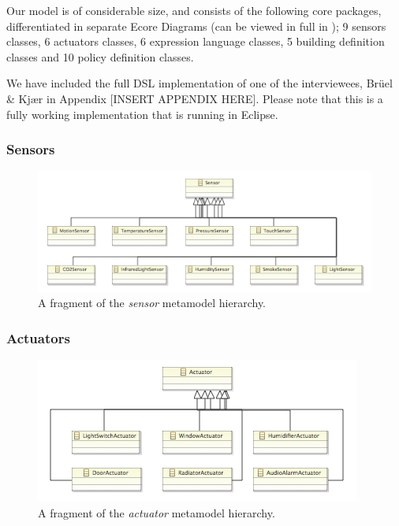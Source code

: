 \documentclass{llncs}
\begin{document}
Our model is of considerable size, and consists of the following core packages, differentiated in separate Ecore Diagrams (can be viewed in full in ); 9 sensors classes, 6 actuators classes, 6 expression language classes, 5 building definition classes and 10 policy definition classes.

We have included the full DSL implementation of one of the interviewees, Br\"{u}el \& Kj\ae r in Appendix [INSERT APPENDIX HERE]. Please note that this is a fully working implementation that is running in Eclipse.

\subsubsection{Sensors}
\begin{figure}
	\centering
    \includegraphics[scale=0.7]{ecore-sensors.png} 
	\caption{A fragment of the \textit{sensor} metamodel hierarchy.}
	\label{fig:ecore-sensors}
\end{figure}

\pagebreak
\subsubsection{Actuators}
\begin{figure}
	\centering
    \includegraphics[scale=0.7]{ecore-actuators.png}   
	\caption{A fragment of the \textit{actuator} metamodel hierarchy.}
	\label{fig:ecore-actuators}
\end{figure}
\end{document}
